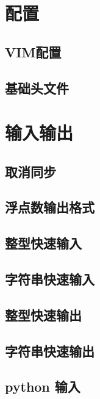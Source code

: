 \chapter{配置}
\section{VIM配置}
\raggedbottom
\hrulefill
\section{基础头文件}
\raggedbottom
\hrulefill

\chapter{输入输出}
\section{取消同步}
\raggedbottom
\hrulefill
\section{浮点数输出格式}
\raggedbottom
\hrulefill
\section{整型快速输入}
\raggedbottom
\hrulefill
\section{字符串快速输入}
\raggedbottom
\hrulefill
\section{整型快速输出}
\raggedbottom
\hrulefill
\section{字符串快速输出}
\raggedbottom
\hrulefill
\section{python 输入}
\raggedbottom
\hrulefill
